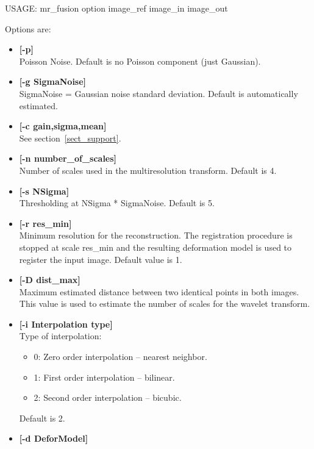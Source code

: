 {\bf
\begin{center}
 USAGE: mr\_fusion option image\_ref image\_in image\_out
\end{center}}
Options are:
\begin{itemize}
\baselineskip=0.4truecm
\itemsep=0.1truecm
\item {\bf [-p]} \\
Poisson Noise. Default is no Poisson component (just Gaussian).
\item {\bf [-g SigmaNoise]} \\
SigmaNoise = Gaussian noise standard deviation. Default is automatically estimated.
\item {\bf [-c gain,sigma,mean]} \\
See section~\ref{sect_support}.
\item {\bf [-n number\_of\_scales]} \\
Number of scales used in the multiresolution transform. Default is 4.
\item {\bf [-s NSigma]} \\
Thresholding at NSigma * SigmaNoise. Default is 5.
\item{\bf [-r res\_min]} \\
Minimum resolution for the reconstruction. 
The registration procedure is stopped at scale res\_min and 
the resulting deformation model is used to register the input image. 
Default value is 1.
\item{\bf [-D dist\_max]} \\
Maximum estimated distance between two identical points in both images. 
This value is used to estimate the number of scales for the wavelet transform.
\item{\bf [-i Interpolation type]} \\
Type of interpolation:
\begin{itemize}
\baselineskip=0.4truecm
\item  0: Zero order interpolation -- nearest neighbor.
\item  1: First order interpolation -- bilinear.
\item  2: Second order interpolation -- bicubic.
\end{itemize}
Default is 2.
\item{\bf [-d DeforModel] } \\

\end{itemize}
